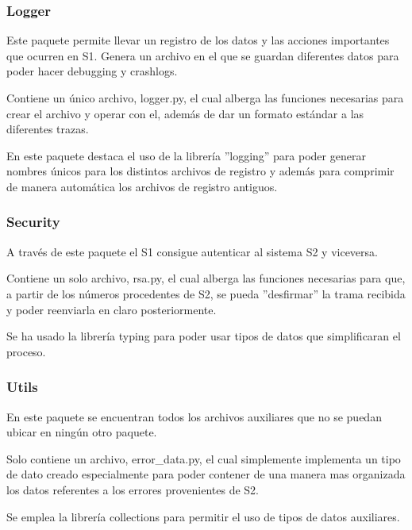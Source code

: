 \subsubsection{Logger}

Este paquete permite llevar un registro de los datos y las acciones importantes que ocurren en \ac{S1}. Genera un archivo en el que se guardan diferentes datos para poder hacer debugging y crashlogs.

Contiene un único archivo, logger.py, el cual alberga las funciones necesarias para crear el archivo y operar con el, además de dar un formato estándar a las diferentes trazas.

En este paquete destaca el uso de la librería ''logging'' para poder generar nombres únicos para los distintos archivos de registro y además para comprimir de manera automática los archivos de registro antiguos.

\subsubsection{Security}

A través de este paquete el \ac{S1} consigue autenticar al sistema \ac{S2} y viceversa.

Contiene un solo archivo, rsa.py, el cual alberga las funciones necesarias para que, a partir de los números procedentes de \ac{S2}, se pueda ''desfirmar'' la trama recibida y poder reenviarla en claro posteriormente.

Se ha usado la librería typing para poder usar tipos de datos que simplificaran el proceso.


\subsubsection{Utils}

En este paquete se encuentran todos los archivos auxiliares que no se puedan ubicar en ningún otro paquete.

Solo contiene un archivo, error\_data.py, el cual simplemente implementa un tipo de dato creado especialmente para poder contener de una manera mas organizada los datos referentes a los errores provenientes de \ac{S2}.

Se emplea la librería collections para permitir el uso de tipos de datos auxiliares.


